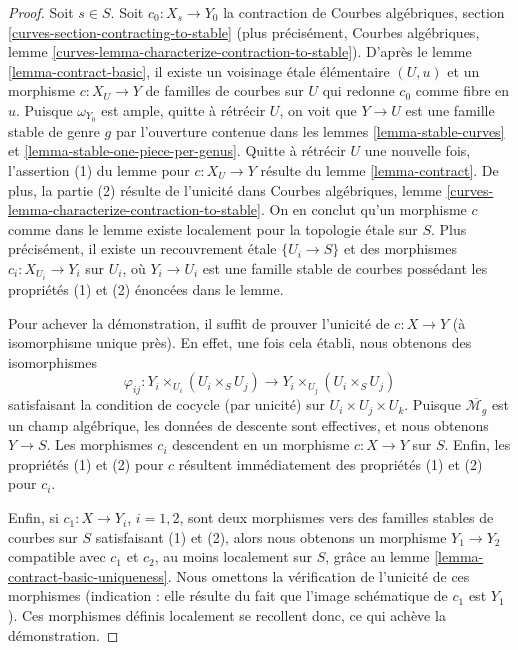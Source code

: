 \begin{proof}
Soit $s \in S$. Soit $c_0 : X_s \to Y_0$ la contraction de
Courbes algébriques, section \ref{curves-section-contracting-to-stable}
(plus précisément, Courbes algébriques, lemme
\ref{curves-lemma-characterize-contraction-to-stable}).
D'après le lemme \ref{lemma-contract-basic},
il existe un voisinage étale élémentaire
$(U, u)$ et un morphisme $c : X_U \to Y$
de familles de courbes sur $U$ qui redonne
$c_0$ comme fibre en $u$.
Puisque $\omega_{Y_0}$ est ample, quitte à rétrécir $U$,
on voit que $Y \to U$ est une famille stable de genre $g$
par l'ouverture contenue dans
les lemmes \ref{lemma-stable-curves} et \ref{lemma-stable-one-piece-per-genus}.
Quitte à rétrécir $U$ une nouvelle fois, l'assertion (1) du lemme pour
$c : X_U \to Y$ résulte du lemme \ref{lemma-contract}.
De plus, la partie (2) résulte de l'unicité dans Courbes algébriques, lemme
\ref{curves-lemma-characterize-contraction-to-stable}.
On en conclut qu'un morphisme $c$ comme dans le lemme existe localement pour
la topologie étale sur $S$. Plus précisément, il existe un recouvrement étale
$\{U_i \to S\}$ et des morphismes $c_i : X_{U_i} \to Y_i$ sur $U_i$,
où $Y_i \to U_i$ est une famille stable de courbes
possédant les propriétés (1) et (2) énoncées dans le lemme.

\medskip\noindent
Pour achever la démonstration, il suffit de prouver l'unicité de $c : X \to Y$
(à isomorphisme unique près). En effet, une fois cela établi, nous
obtenons des isomorphismes
$$
\varphi_{ij} :
Y_i \times_{U_i} (U_i \times_S U_j)
\longrightarrow
Y_i \times_{U_j} (U_i \times_S U_j)
$$
satisfaisant la condition de cocycle (par unicité) sur
$U_i \times U_j \times U_k$. Puisque $\overline{\mathcal{M}_g}$
est un champ algébrique, les données de descente sont effectives,
et nous obtenons $Y \to S$. Les morphismes $c_i$ descendent en un morphisme
$c : X \to Y$ sur $S$. Enfin, les propriétés (1) et (2) pour $c$
résultent immédiatement des propriétés (1) et (2) pour $c_i$.

\medskip\noindent
Enfin, si $c_1 : X \to Y_i$, $i = 1, 2$, sont deux morphismes vers
des familles stables de courbes sur $S$ satisfaisant (1) et (2), alors
nous obtenons un morphisme $Y_1 \to Y_2$ compatible avec $c_1$ et $c_2$,
au moins localement sur $S$, grâce au lemme \ref{lemma-contract-basic-uniqueness}.
Nous omettons la vérification de l'unicité de ces morphismes
(indication : elle résulte du fait que l'image schématique
de $c_1$ est $Y_1$). Ces morphismes définis localement se recollent donc,
ce qui achève la démonstration.
\end{proof}

